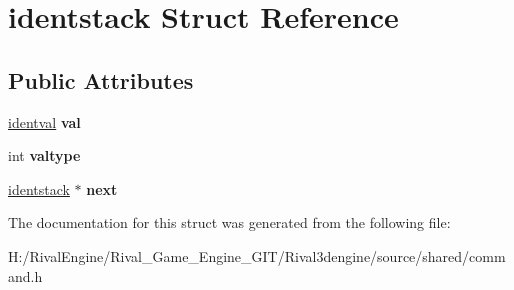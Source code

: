 \hypertarget{structidentstack}{}\section{identstack Struct Reference}
\label{structidentstack}
\subsection*{Public Attributes}
\begin{DoxyCompactItemize}
\item 
\mbox{\label{structidentstack_aada222658d953e2de2ea3bccdc77db83}} 
\hyperlink{structidentval}{identval} {\bfseries val}
\item 
\mbox{\label{structidentstack_a9cc11ccc66442d66dcd45d08b2167560}} 
int {\bfseries valtype}
\item 
\mbox{\label{structidentstack_ac1cbdbcae8a63ec52f5259a5a8f18137}} 
\hyperlink{structidentstack}{identstack} $\ast$ {\bfseries next}
\end{DoxyCompactItemize}


The documentation for this struct was generated from the following file\+:\begin{DoxyCompactItemize}
\item 
H\+:/\+Rival\+Engine/\+Rival\+\_\+\+Game\+\_\+\+Engine\+\_\+\+G\+I\+T/\+Rival3dengine/source/shared/command.\+h\end{DoxyCompactItemize}
